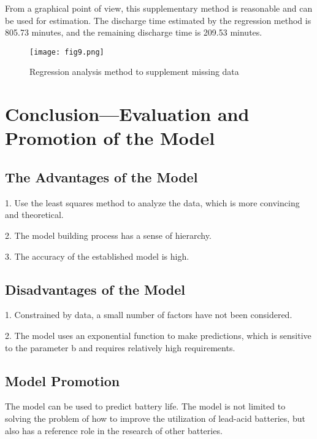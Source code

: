 \documentclass[conference]{IEEEtran}
\begin{document}
From a graphical point of view, this supplementary method is reasonable and can be used for estimation. The discharge time estimated by the regression method is 805.73 minutes, and the remaining discharge time is 209.53 minutes.

\begin{figure}[htbp]
	\centerline{\texttt{[image: fig9.png]}}
	\caption{Regression analysis method to supplement missing data}
	\label{fig9}
\end{figure}
\section{Conclusion—Evaluation and Promotion of the Model}
\subsection{The Advantages of the Model}

1. Use the least squares method to analyze the data, which is more convincing and theoretical.

2. The model building process has a sense of hierarchy.

3. The accuracy of the established model is high.

\subsection{Disadvantages of the Model}
1. Constrained by data, a small number of factors have not been considered.

2. The model uses an exponential function to make predictions, which is sensitive to the parameter b and requires relatively high requirements.

\subsection{Model Promotion}
The model can be used to predict battery life. The model is not limited to solving the problem of how to improve the utilization of lead-acid batteries, but also has a reference role in the research of other batteries.
\end{document}
